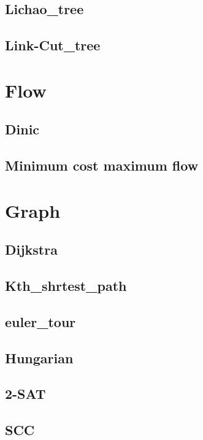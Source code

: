     \subsection{Lichao\_tree}
        
    \subsection{Link-Cut\_tree}
        

\section{Flow}
    \subsection{Dinic}
        
    \subsection{Minimum cost maximum flow}
        

\section{Graph}
    \subsection{Dijkstra}
        
    \subsection{Kth\_shrtest\_path}
        
    \subsection{euler\_tour}
        
    \subsection{Hungarian}
        
    \subsection{2-SAT}
        
    \subsection{SCC}
        
